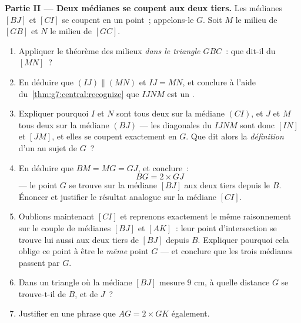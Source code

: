 \begin{problem}
\medskip
\noindent\textbf{Partie II --- Deux médianes se coupent aux deux
tiers.}
Les médianes $[BJ]$ et $[CI]$ se coupent en un point~; appelons-le
$G$. Soit $M$ le milieu de $[GB]$ et $N$ le milieu de $[GC]$.
\begin{enumerate}[resume]
  \item Appliquer le théorème des milieux \emph{dans le triangle
        $GBC$}~: que dit-il du  $[MN]$~?
  \item En déduire que $(IJ) \parallel (MN)$ et $IJ = MN$, et
        conclure à l'aide du~\cref{thm:g7:central:recognize} que
        $IJNM$ est un .
  \item Expliquer pourquoi $I$ et $N$ sont tous deux sur la médiane
        $(CI)$, et $J$ et $M$ tous deux sur la médiane $(BJ)$ ---
        les diagonales du  $IJNM$ sont donc $[IN]$
        et $[JM]$, et elles se coupent exactement en $G$. Que dit
        alors la \emph{définition} d'un  au sujet de
        $G$~?
  \item En déduire que $BM = MG = GJ$, et conclure~:
        \[
        BG = 2 \times GJ
        \]
        --- le point $G$ se trouve sur la médiane $[BJ]$ aux deux
        tiers depuis le  $B$. Énoncer et justifier le résultat
        analogue sur la médiane $[CI]$.
  \item Oublions maintenant $[CI]$ et reprenons exactement le même
        raisonnement sur le couple de médianes $[BJ]$ et $[AK]$~:
        leur point d'intersection se trouve lui aussi aux deux tiers
        de $[BJ]$ depuis $B$. Expliquer pourquoi cela oblige ce
        point à être le \emph{même} point $G$ --- et conclure que
        les trois médianes passent par $G$.
  \item Dans un triangle où la médiane $[BJ]$ mesure $9$ cm, à
        quelle distance $G$ se trouve-t-il de $B$, et de $J$~?
  \item Justifier en une phrase que $AG = 2 \times GK$ également.
\end{enumerate}


\end{problem}
